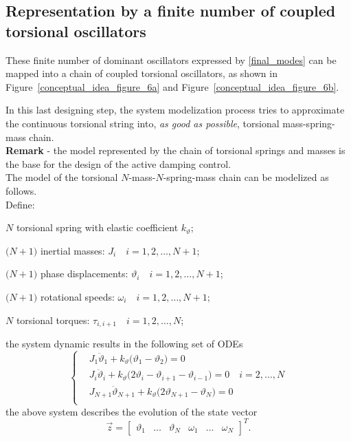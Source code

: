 \documentclass[12pt,a4paper]{scrartcl}
\begin{document}
\begin{onehalfspace}
\subsection{Representation by a finite number of coupled torsional oscillators}
These finite number of dominant oscillators expressed by  \eqref{final_modes} can be mapped into a chain of coupled torsional oscillators, as shown in Figure~\ref{conceptual_idea_figure_6a} and Figure~\ref{conceptual_idea_figure_6b}.

In this last designing step, the system modelization process tries to approximate the continuous torsional string into, \textit{as good as possible}, torsional mass-spring-mass chain. \\

\noindent\textbf{Remark} - the model represented by the chain of torsional springs and masses is the base for the design of the active damping control. \\

\noindent The model of the torsional $N$-mass-$N$-spring-mass chain can be modelized as follows. \\

Define:
\begin{myitemize_1}
	\item[--] $N$ torsional spring with elastic coefficient $k_\vartheta$; 
	\item[--] $\big(N+1\big)$ inertial masses: $J_i\quad i=1,2,\dots,N+1$; 
	\item[--] $\big(N+1\big)$ phase displacements: $\vartheta_i\quad i=1,2,\dots,N+1$; 
	\item[--] $\big(N+1\big)$ rotational speeds: $\omega_i\quad i=1,2,\dots,N+1$; 
	\item[--] $N$ torsional torques: $\tau_{i,i+1}\quad i=1,2,\dots,N$; 
\end{myitemize_1}
the system dynamic results in the following set of ODEs
\begin{equation}
\left\lbrace \begin{aligned}
		& J_1\ddot{\vartheta}_1 + k_\vartheta\big(\vartheta_1-\vartheta_2\big) = 0 \\[6pt]
		& J_i \ddot{\vartheta}_i + k_\vartheta\big(2\vartheta_i-\vartheta_{i+1}-\vartheta_{i-1}\big) = 0\quad i=2,\dots,N\\[6pt]
		& J_{N+1} \ddot{\vartheta}_{N+1} + k_\vartheta\big(2\vartheta_{N+1} - \vartheta_{N}\big) = 0 \\[6pt]
	\end{aligned} \right. 
\end{equation}
the above system describes the evolution of the state vector
\begin{equation}
	\vec{z} = \begin{bmatrix}
		\vartheta_1 & \dots & \vartheta_N & \omega_1 & \dots & \omega_N
	\end{bmatrix} ^T.
\end{equation}


\end{onehalfspace}
\end{document}

